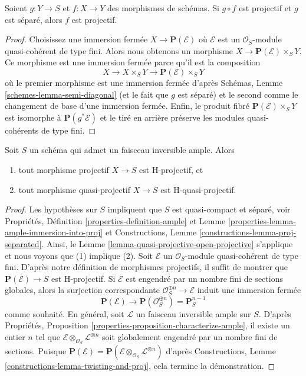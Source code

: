\begin{lemma}
\label{lemma-projective-permanence}
Soient $g : Y \to S$ et $f : X \to Y$ des morphismes de schémas. Si $g \circ f$
est projectif et $g$ est séparé, alors $f$
est projectif.
\end{lemma}

\begin{proof}
Choisissez une immersion fermée $X \to \mathbf{P}(\mathcal{E})$ où $\mathcal{E}$ est un $\mathcal{O}_S$-module
quasi-cohérent de type fini. Alors nous
obtenons un morphisme $X \to \mathbf{P}(\mathcal{E}) \times_S Y$. Ce morphisme est
une immersion fermée parce qu'il est la composition
$$
X \to X \times_S Y \to \mathbf{P}(\mathcal{E}) \times_S Y
$$
où le premier morphisme est une immersion fermée
d'après Schémas, Lemme \ref{schemes-lemma-semi-diagonal} (et le
fait que $g$ est séparé) et
le second comme le changement de base d'une immersion
fermée. Enfin, le produit fibré $\mathbf{P}(\mathcal{E}) \times_S Y$ est isomorphe
à $\mathbf{P}(g^*\mathcal{E})$ et le tiré en arrière préserve les
modules quasi-cohérents de type fini.
\end{proof}

\begin{lemma}
\label{lemma-projective-over-quasi-projective-is-H-projective}
Soit $S$ un schéma qui admet un faisceau inversible ample. Alors
\begin{enumerate}
\item tout morphisme projectif $X \to S$ est H-projectif, et
\item tout morphisme quasi-projectif $X \to S$ est H-quasi-projectif.
\end{enumerate}
\end{lemma}

\begin{proof}
Les hypothèses sur $S$ impliquent que $S$ est
quasi-compact et séparé, voir Propriétés, Définition
\ref{properties-definition-ample} et Lemme \ref{properties-lemma-ample-immersion-into-proj} et Constructions,
Lemme \ref{constructions-lemma-proj-separated}. Ainsi, le Lemme \ref{lemma-quasi-projective-open-projective}
s'applique et nous voyons que (1) implique
(2). Soit $\mathcal{E}$ un $\mathcal{O}_S$-module
quasi-cohérent de type fini. D'après notre définition
de morphismes projectifs, il suffit de montrer que
$\mathbf{P}(\mathcal{E}) \to S$ est H-projectif. Si $\mathcal{E}$
est engendré par un nombre fini de sections globales,
alors la surjection correspondante $\mathcal{O}_S^{\oplus n} \to \mathcal{E}$ induit
une immersion fermée
$$
\mathbf{P}(\mathcal{E}) \longrightarrow
\mathbf{P}(\mathcal{O}_S^{\oplus n}) = \mathbf{P}^{n - 1}_S
$$
comme souhaité. En général, soit $\mathcal{L}$ un faisceau
inversible ample sur $S$. D'après Propriétés,
Proposition \ref{properties-proposition-characterize-ample},
il existe un entier $n$ tel que
$\mathcal{E} \otimes_{\mathcal{O}_S} \mathcal{L}^{\otimes n}$ soit globalement engendré
par un nombre
fini de sections. Puisque $\mathbf{P}(\mathcal{E}) =
\mathbf{P}(\mathcal{E} \otimes_{\mathcal{O}_S} \mathcal{L}^{\otimes n})$ d'après Constructions,
Lemme \ref{constructions-lemma-twisting-and-proj}, cela termine la démonstration.
\end{proof}

